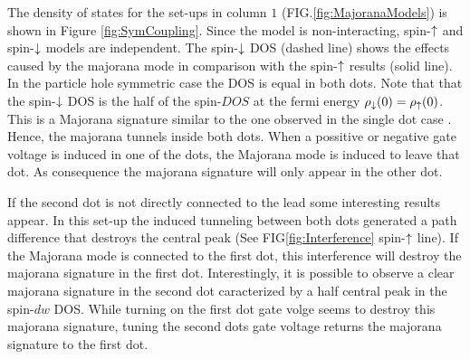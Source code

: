 \documentclass[showpacs,aps,prb,reprint,superscriptaddress]{revtex4-1}
\begin{document}
     
     The density of states for the set-ups in column $1$ (FIG.\ref{fig:MajoranaModels}) is shown in Figure \ref{fig:SymCoupling}. Since the model is non-interacting, spin-$\uparrow$ and spin-$\downarrow$ models are independent. The spin-$\downarrow$ DOS (dashed line) shows the effects caused by the majorana mode in comparison with the spin-$\uparrow$  results (solid line). In the particle hole symmetric case the DOS is equal in both dots. Note that that the spin-$\downarrow$ DOS is the half of the spin-$DOS$ at the fermi energy $\rho_\downarrow(0) = \rho_\uparrow(0)$. This is a Majorana signature similar to the one observed in the single dot case \cite{liu_detecting_2011}. Hence, the majorana tunnels inside both dots. When a possitive or negative gate voltage is induced in one of the dots,  the Majorana mode is induced to leave that dot. As consequence the majorana signature will only appear in the other dot. 
     
    If the second dot is not directly connected to the lead some interesting results appear. In this set-up the induced tunneling between both dots generated a path difference that destroys the central peak (See FIG\ref{fig:Interference} spin-$\uparrow$ line). If the Majorana mode is connected to the first dot, this interference will destroy the majorana signature in the first dot. Interestingly, it is possible to observe a clear majorana signature in the second dot caracterized by a half central peak in the spin-$dw$ DOS. While turning on the first dot gate volge seems to destroy this majorana signature, tuning the second dots gate voltage returns the majorana signature to the first dot. 
    
\end{document}
